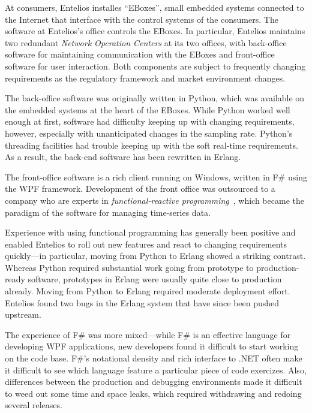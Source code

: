 \documentclass{jfp1}
\begin{document}
At consumers, Entelios installes ``EBoxes'', small embedded systems
connected to the Internet that interface with the control systems of
the consumers.  The software at Entelios's office controls the EBoxes.
In particular, Entelios maintains two redundant \textit{Network
  Operation Centers} at its two offices, with back-office software for
maintaining communication with the EBoxes and front-office software
for user interaction.  Both components are subject to frequently
changing requirements as the regulatory framework and market
environment changes.

The back-office software was originally written in Python, which was
available on the embedded systems at the heart of the EBoxes.  While
Python worked well enough at first, software had difficulty keeping up
with changing requirements, however, especially with unanticipated
changes in the sampling rate.  Python's threading facilities had
trouble keeping up with the soft real-time requirements.  As a result,
the back-end software has been rewritten in Erlang.

The front-office software is a rich client running on Windows, written
in F\# using the WPF framework.  Development of the front office was
outsourced to a company who are experts in \textit{functional-reactive
  programming}~\cite{Elliott:2009:PFR:1596638.1596643}, which became
the paradigm of the software for managing time-series data.

Experience with using functional programming has generally been
positive and enabled Entelios to roll out new features and react to
changing requirements quickly---in particular, moving from Python to
Erlang showed a striking contrast.  Whereas Python required substantial
work going from prototype to production-ready software, prototypes in
Erlang were usually quite close to production already.  Moving from
Python to Erlang required moderate deployment effort.  Entelios found
two bugs in the Erlang system that have since been pushed upstream.

The experience of F\# was more mixed---while F\# is an effective
language for developing WPF applications, new developers found it
difficult to start working on the code base.  F\#'s notational density
and rich interface to .NET often make it difficult to see which
language feature a particular piece of code exercizes.  Also,
differences between the production and debugging environments made it
difficult to weed out some time and space leaks, which required
withdrawing and redoing several releases.
\end{document}
